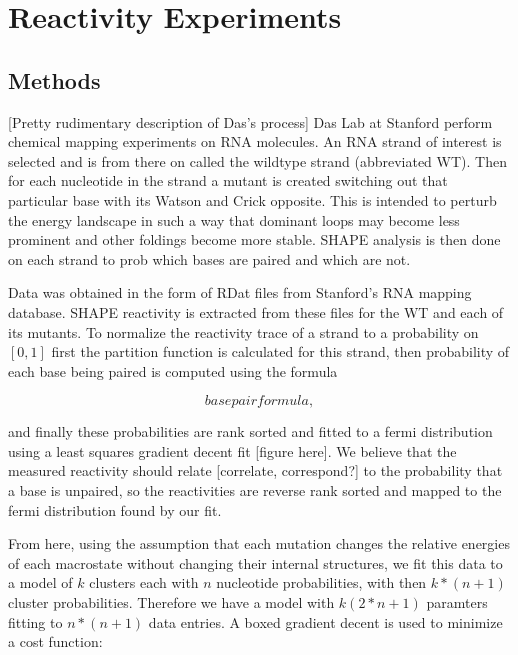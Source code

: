 \chapter{Reactivity Experiments}
\section{Methods}
[Pretty rudimentary description of Das's process] Das Lab at Stanford
perform chemical mapping experiments on RNA molecules. An RNA strand
of interest is selected and is from there on called the wildtype
strand (abbreviated WT). Then for each nucleotide in the strand a
mutant is created switching out that particular base with its Watson
and Crick opposite. This is intended to perturb the energy landscape
in such a way that dominant loops may become less prominent and other
foldings become more stable. SHAPE analysis is then done on each
strand to prob which bases are paired and which are not.

Data was obtained in the form of RDat files from Stanford's RNA
mapping database. SHAPE reactivity is extracted from these files for
the WT and each of its mutants. To normalize the reactivity trace of a
strand to a probability on $[0, 1]$ first the partition function is
calculated for this strand, then probability of each base being paired
is computed using the formula

$$ base pair formula ,$$

and finally these probabilities are rank sorted and fitted to a fermi
distribution using a least squares gradient decent fit [figure
here]. We believe that the measured reactivity should relate
[correlate, correspond?] to the probability that a base is unpaired,
so the reactivities are reverse rank sorted and mapped to the fermi
distribution found by our fit.

From here, using the assumption that each mutation changes the
relative energies of each macrostate without changing their internal
structures, we fit this data to a model of $k$ clusters each with $n$
nucleotide probabilities, with then $k*(n+1)$ cluster
probabilities. Therefore we have a model with $k(2*n + 1)$ paramters
fitting to $n*(n+1)$ data entries. A boxed gradient decent is used to
minimize a cost function:

